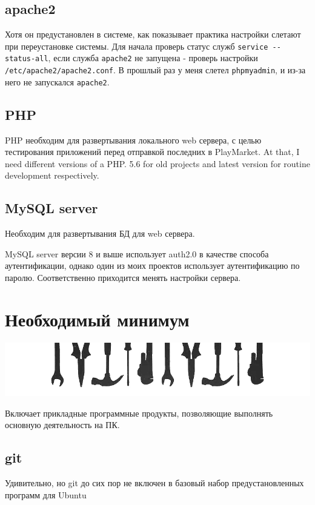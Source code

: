 \documentclass[a4paper, 12pt]{report}
\begin{document}
\subsection{apache2} Хотя он предустановлен в системе, как показывает практика настройки слетают при переустановке системы. Для начала проверь статус служб
\lstinline|service --status-all|, если служба \lstinline|apache2| не запущена - проверь настройки \lstinline|/etc/apache2/apache2.conf|. В прошлый раз у меня слетел \lstinline|phpmyadmin|, и из-за него не запускался \lstinline|apache2|.
\subsection{PHP} PHP необходим для развертывания локального web сервера, с целью тестирования приложений перед отправкой последних в PlayMarket. At that, I need different versions of a PHP. 5.6 for old projects and latest version for routine development respectively.

\subsection{MySQL server} Необходим для развертывания БД для web сервера.

 MySQL server версии 8 и выше использует auth2.0 в качестве способа аутентификации, однако один из моих проектов использует аутентификацию по паролю. Соответственно приходится менять настройки сервера.


\clearpage
\section{Необходимый минимум} 
\begin{center}
	\includegraphics[scale=0.6]{labor}
\end{center} 
Включает прикладные программные продукты, позволяющие выполнять основную деятельность на ПК.
\subsection{git} Удивительно, но git до сих пор не включен в базовый набор предустановленных программ для Ubuntu
\end{document}
